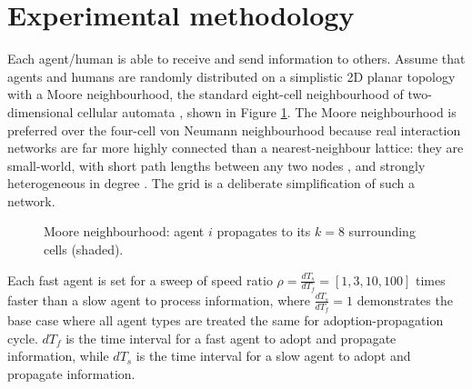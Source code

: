 \documentclass{article}
\begin{document}
\section{Experimental methodology}

Each agent/human is able to receive and send information to others. Assume that agents and humans are randomly distributed on a simplistic 2D planar topology with a Moore neighbourhood, the standard eight-cell neighbourhood of two-dimensional cellular automata \cite{wolfram1983}, shown in Figure \ref{fig:fig1}. The Moore neighbourhood is preferred over the four-cell von Neumann neighbourhood because real interaction networks are far more highly connected than a nearest-neighbour lattice: they are small-world, with short path lengths between any two nodes \cite{watts1998}, and strongly heterogeneous in degree \cite{barabasi1999}. The grid is a deliberate simplification of such a network. \\

\begin{figure}[ht]
    \centering
    \caption{Moore neighbourhood: agent $i$ propagates to its $k=8$ surrounding cells (shaded).}
    \label{fig:fig1}
\end{figure} 

Each fast agent is set for a sweep of speed ratio $\rho = \frac{dT_s}{dT_f}= [1, 3, 10, 100]$ times faster than a slow agent to process information, where $\frac{dT_s}{dT_f}= 1$ demonstrates the base case where all agent types are treated the same for adoption-propagation cycle. $dT_f$ is the time interval for a fast agent to adopt and propagate information, while $dT_s$ is the time interval for a slow agent to adopt and propagate information. \\
\end{document}
